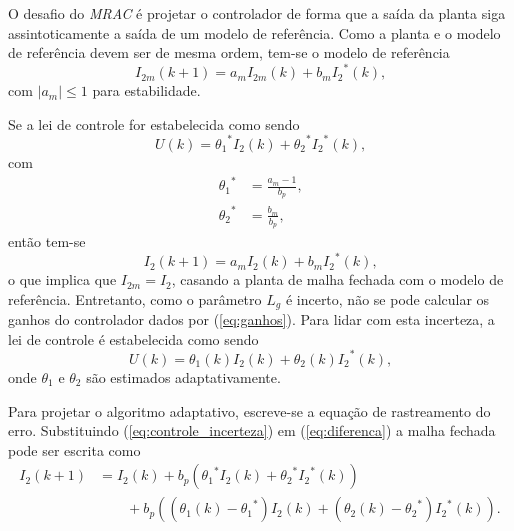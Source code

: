     O desafio do \emph{MRAC} é projetar o controlador de forma que a saída da planta siga assintoticamente a saída de um modelo de referência. Como a planta e o modelo de referência devem ser de mesma ordem, tem-se o modelo de referência
    \begin{equation}
        I_{2m}(k + 1) = a_m I_{2m}(k) + b_m {I_2}^* (k) \text{,}
        \label{eq:modelo_referencia}
    \end{equation}
    com $| a_m | \le 1$ para estabilidade.

    Se a lei de controle for estabelecida como sendo
    \begin{equation}
        U (k) = {\theta_1}^* I_2 (k) + {\theta_2}^* {I_2}^* (k) \text{,}
    \end{equation}
    com
    \begin{equation}
        \begin{split}
            {\theta_1}^* & = \frac{a_m - 1}{b_p} \text{,}\\
            {\theta_2}^* & = \frac{b_m}{b_p} \text{,}
        \end{split}
        \label{eq:ganhos}
    \end{equation}
    então tem-se
    \begin{equation}
        I_2 (k + 1) = a_m I_2 (k) + b_m {I_2}^* (k) \text{,}
    \end{equation}
    o que implica que $I_{2m} = I_2$, casando a planta de malha fechada com o modelo de referência. Entretanto, como o parâmetro $L_g$ é incerto, não se pode calcular os ganhos do controlador dados por (\ref{eq:ganhos}). Para lidar com esta incerteza, a lei de controle é estabelecida como sendo
    \begin{equation}
        U (k) = \theta_1 (k) I_2 (k) + \theta_2 (k) {I_2}^* (k) \text{,}
        \label{eq:controle_incerteza}
    \end{equation}
    onde $\theta_1$ e $\theta_2$ são estimados adaptativamente.

    Para projetar o algoritmo adaptativo, escreve-se a equação de rastreamento do erro. Substituindo (\ref{eq:controle_incerteza}) em (\ref{eq:diferenca}) a malha fechada pode ser escrita como
    \begin{equation}
        \begin{split}
        I_2 (k + 1) &= I_2 (k) + b_p \left( {\theta_1}^* I_2 (k) + {\theta_2}^* {I_2}^*
            (k) \right)\\
            &\qquad {}+ b_p \left( (\theta_1 (k) - {\theta_1}^*) I_2 (k) + ( \theta_2 (k)
            - {\theta_2}^*) {I_2}^* (k) \right) \text{.}
        \end{split}
        \label{eq:malha_fechada}
    \end{equation}

